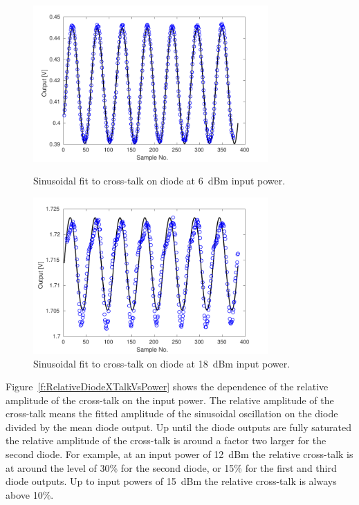 \begin{figure}
  \centering
  \includegraphics[width=0.8\textwidth]{Figures/phaseMons/Diode1_Power6}
  \caption{Sinusoidal fit to cross-talk on diode at 6~dBm input power.}
  \label{f:Diode1_Power6}
  \includegraphics[width=0.8\textwidth]{Figures/phaseMons/Diode1_Power18}
  \caption{Sinusoidal fit to cross-talk on diode at 18~dBm input power.}
  \label{f:Diode1_Power18}
\end{figure}

Figure~\ref{f:RelativeDiodeXTalkVsPower} shows the dependence of the relative amplitude of the cross-talk on the input power. The relative amplitude of the cross-talk means the fitted amplitude of the sinusoidal oscillation on the diode divided by the mean diode output. Up until the diode outputs are fully saturated the relative amplitude of the cross-talk is around a factor two larger for the second diode. For example, at an input power of 12~dBm the relative cross-talk is at around the level of 30\% for the second diode, or 15\% for the first and third diode outputs. Up to input powers of 15~dBm the relative cross-talk is always above 10\%.

